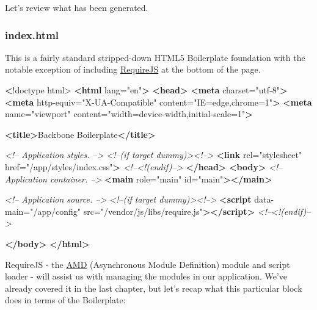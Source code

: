 \documentclass[9pt]{book}
\newenvironment{Shaded}{}{}
\newcommand{\KeywordTok}[1]{\textcolor[rgb]{0.00,0.44,0.13}{\textbf{{#1}}}}
\newcommand{\StringTok}[1]{\textcolor[rgb]{0.25,0.44,0.63}{{#1}}}
\newcommand{\CommentTok}[1]{\textcolor[rgb]{0.38,0.63,0.69}{\textit{{#1}}}}
\newcommand{\OtherTok}[1]{\textcolor[rgb]{0.00,0.44,0.13}{{#1}}}
\newcommand{\ErrorTok}[1]{\textcolor[rgb]{1.00,0.00,0.00}{\textbf{{#1}}}}
\newcommand{\NormalTok}[1]{{#1}}
\begin{document}
Let's review what has been generated.

\subsubsection{index.html}\label{index.html}

This is a fairly standard stripped-down HTML5 Boilerplate foundation
with the notable exception of including
\href{http://requirejs.org}{RequireJS} at the bottom of the page.

\begin{Shaded}
\begin{Highlighting}[]
\ErrorTok{<}\NormalTok{!doctype html>}
\KeywordTok{<html}\OtherTok{ lang=}\StringTok{"en"}\KeywordTok{>}
\KeywordTok{<head>}
  \KeywordTok{<meta}\OtherTok{ charset=}\StringTok{"utf-8"}\KeywordTok{>}
  \KeywordTok{<meta}\OtherTok{ http-equiv=}\StringTok{"X-UA-Compatible"}\OtherTok{ content=}\StringTok{"IE=edge,chrome=1"}\KeywordTok{>}
  \KeywordTok{<meta}\OtherTok{ name=}\StringTok{"viewport"}\OtherTok{ content=}\StringTok{"width=device-width,initial-scale=1"}\KeywordTok{>}

  \KeywordTok{<title>}\NormalTok{Backbone Boilerplate}\KeywordTok{</title>}

  \CommentTok{<!-- Application styles. -->}
  \CommentTok{<!--(if target dummy)><!-->}
  \KeywordTok{<link}\OtherTok{ rel=}\StringTok{"stylesheet"}\OtherTok{ href=}\StringTok{"/app/styles/index.css"}\KeywordTok{>}
  \CommentTok{<!--<!(endif)-->}
\KeywordTok{</head>}
\KeywordTok{<body>}
  \CommentTok{<!-- Application container. -->}
  \KeywordTok{<main}\OtherTok{ role=}\StringTok{"main"}\OtherTok{ id=}\StringTok{"main"}\KeywordTok{></main>}

  \CommentTok{<!-- Application source. -->}
  \CommentTok{<!--(if target dummy)><!-->}
  \KeywordTok{<script}\OtherTok{ data-main=}\StringTok{"/app/config"}\OtherTok{ src=}\StringTok{"/vendor/js/libs/require.js"}\KeywordTok{></script>}
  \CommentTok{<!--<!(endif)-->}

\KeywordTok{</body>}
\KeywordTok{</html>}
\end{Highlighting}
\end{Shaded}

RequireJS - the \href{https://github.com/amdjs/amdjs-api/wiki/AMD}{AMD}
(Asynchronous Module Definition) module and script loader - will assist
us with managing the modules in our application. We've already covered
it in the last chapter, but let's recap what this particular block does
in terms of the Boilerplate:
\end{document}
